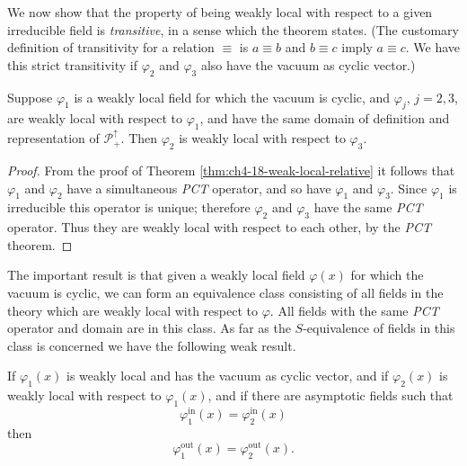 We now show that the property of being weakly local with respect to a given
irreducible field is \emph{transitive}, in a sense which the theorem states.
(The customary definition of transitivity for a relation $\equiv$ is
$a\equiv b$ and $b\equiv c$ imply $a\equiv c$. We have this strict
transitivity if $\varphi_2$ and $\varphi_3$ also have the vacuum as cyclic
vector.)

\begin{theorem}[4-19]\label{thm:ch4-19-transitivity}
Suppose $\varphi_1$ is a weakly local field for which the vacuum is cyclic,
and $\varphi_j$, $j=2,3$, are weakly local with respect to $\varphi_1$, and
have the same domain of definition and representation of $\mathcal
P_+^\uparrow$. Then $\varphi_2$ is weakly local with respect to $\varphi_3$.
\end{theorem}

\begin{proof}
From the proof of Theorem \ref{thm:ch4-18-weak-local-relative} it follows that $\varphi_1$ and $\varphi_2$
have a simultaneous \emph{PCT} operator, and so have $\varphi_1$ and
$\varphi_3$. Since $\varphi_1$ is irreducible this operator is unique;
therefore $\varphi_2$ and $\varphi_3$ have the same \emph{PCT} operator. Thus
they are weakly local with respect to each other, by the \emph{PCT} theorem.
\end{proof}

The important result is that given a weakly local field $\varphi(x)$ for which
the vacuum is cyclic, we can form an equivalence class consisting of all
fields in the theory which are weakly local with respect to $\varphi$. All
fields with the same \emph{PCT} operator and domain are in this class. As far
as the $S$-equivalence of fields in this class is concerned we have the
following weak result.

\begin{theorem}[4-20]\label{thm:ch4-20-asymptotic-fields}
If $\varphi_1(x)$ is weakly local and has the vacuum as cyclic vector, and if
$\varphi_2(x)$ is weakly local with respect to $\varphi_1(x)$, and if there
are asymptotic fields such that
\begin{equation}
  \varphi_1^{\mathrm{in}}(x)=\varphi_2^{\mathrm{in}}(x)
  \tag{4-99}\label{eq:ch4-asymptotic-in}
\end{equation}
then
\begin{equation}
  \varphi_1^{\mathrm{out}}(x)=\varphi_2^{\mathrm{out}}(x).
  \tag{4-100}\label{eq:ch4-asymptotic-out}
\end{equation}

\end{theorem}

